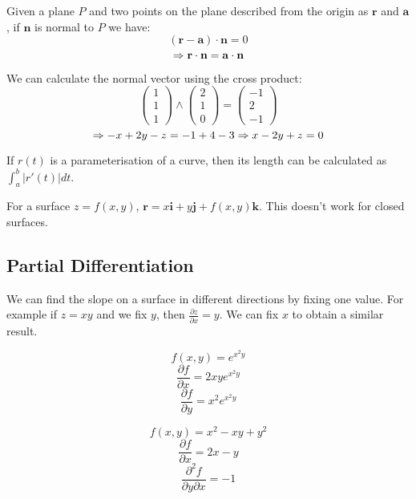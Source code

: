 \documentclass[a4paper,10pt]{article}
\begin{document}
\begin{ex}
	Given a plane $P$ and two points on the plane described from the origin
	as $\mathbf{r}$ and $\mathbf{a}$, if $\mathbf{n}$ is normal to $P$ we
	have:
	\[ (\mathbf{r} - \mathbf{a}) \cdot \mathbf{n} = 0 \]
	\[ \Rightarrow \mathbf{r} \cdot \mathbf{n} = \mathbf{a} \cdot \mathbf{n} \]

	We can calculate the normal vector using the cross product:
	\[
		\begin{pmatrix}
			1\\1\\1
		\end{pmatrix}
		\wedge
		\begin{pmatrix}
			2\\1\\0
		\end{pmatrix}
		=
		\begin{pmatrix}
			-1\\2\\-1
		\end{pmatrix}
	\]
	\[ \Rightarrow -x + 2y - z = -1 + 4 - 3 \Rightarrow x - 2y + z = 0 \]
\end{ex}

If $r(t)$ is a parameterisation of a curve, then its length can be calculated
as $ \int_a^b | r'(t) | dt $.

For a surface $z = f(x,y)$, $\mathbf{r} = x\mathbf{i} + y\mathbf{j} +
f(x,y)\mathbf{k}$. This doesn't work for closed surfaces.

\subsection{Partial Differentiation}

We can find the slope on a surface in different directions by fixing one value.
For example if $z = xy$ and we fix $y$, then $\frac{\partial z}{\partial x} =
y$. We can fix $x$ to obtain a similar result.

\begin{ex}
	\[ f(x,y) = e^{x^2y} \]
	\[ \frac{\partial f}{\partial x} = 2xy e^{x^2y} \]
	\[ \frac{\partial f}{\partial y} = x^2 e^{x^2y} \]
\end{ex}

\begin{ex}
	\[ f(x,y) = x^2 - xy + y^2 \]
	\[ \frac{\partial f}{\partial x} = 2x - y \]
	\[ \frac{\partial ^2 f}{\partial y \partial x} = -1 \]
\end{ex}
\end{document}

